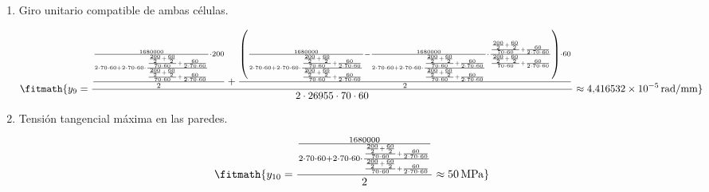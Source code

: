 \begin{enumerate}
\[\fitmath{y_{8}=\frac{1680000}{2\cdot 70\cdot 60+2\cdot 70\cdot 60\cdot \frac{\frac{\frac{200}{2}+\frac{60}{2}}{70\cdot 60}+\frac{60}{2\cdot 70\cdot 60}}{\frac{\frac{200}{2}+\frac{60}{2}}{70\cdot 60}+\frac{60}{2\cdot 70\cdot 60}}}-\frac{1680000}{2\cdot 70\cdot 60+2\cdot 70\cdot 60\cdot \frac{\frac{\frac{200}{2}+\frac{60}{2}}{70\cdot 60}+\frac{60}{2\cdot 70\cdot 60}}{\frac{\frac{200}{2}+\frac{60}{2}}{70\cdot 60}+\frac{60}{2\cdot 70\cdot 60}}}\cdot \frac{\frac{\frac{200}{2}+\frac{60}{2}}{70\cdot 60}+\frac{60}{2\cdot 70\cdot 60}}{\frac{\frac{200}{2}+\frac{60}{2}}{70\cdot 60}+\frac{60}{2\cdot 70\cdot 60}}\approx 6{,}946121\times10^{-164}\,\mathrm{N/mm}}\]

\item Giro unitario compatible de ambas células.

\[\fitmath{y_{9}=\frac{\frac{\frac{1680000}{2\cdot 70\cdot 60+2\cdot 70\cdot 60\cdot \frac{\frac{\frac{200}{2}+\frac{60}{2}}{70\cdot 60}+\frac{60}{2\cdot 70\cdot 60}}{\frac{\frac{200}{2}+\frac{60}{2}}{70\cdot 60}+\frac{60}{2\cdot 70\cdot 60}}}\cdot 200}{2}+\frac{\left(\frac{1680000}{2\cdot 70\cdot 60+2\cdot 70\cdot 60\cdot \frac{\frac{\frac{200}{2}+\frac{60}{2}}{70\cdot 60}+\frac{60}{2\cdot 70\cdot 60}}{\frac{\frac{200}{2}+\frac{60}{2}}{70\cdot 60}+\frac{60}{2\cdot 70\cdot 60}}}-\frac{1680000}{2\cdot 70\cdot 60+2\cdot 70\cdot 60\cdot \frac{\frac{\frac{200}{2}+\frac{60}{2}}{70\cdot 60}+\frac{60}{2\cdot 70\cdot 60}}{\frac{\frac{200}{2}+\frac{60}{2}}{70\cdot 60}+\frac{60}{2\cdot 70\cdot 60}}}\cdot \frac{\frac{\frac{200}{2}+\frac{60}{2}}{70\cdot 60}+\frac{60}{2\cdot 70\cdot 60}}{\frac{\frac{200}{2}+\frac{60}{2}}{70\cdot 60}+\frac{60}{2\cdot 70\cdot 60}}\right)\cdot 60}{2}}{2\cdot 26955\cdot 70\cdot 60}\approx 4{,}416532\times10^{-5}\,\mathrm{rad/mm}}\]

\item Tensión tangencial máxima en las paredes.

\[\fitmath{y_{10}=\frac{\frac{1680000}{2\cdot 70\cdot 60+2\cdot 70\cdot 60\cdot \frac{\frac{\frac{200}{2}+\frac{60}{2}}{70\cdot 60}+\frac{60}{2\cdot 70\cdot 60}}{\frac{\frac{200}{2}+\frac{60}{2}}{70\cdot 60}+\frac{60}{2\cdot 70\cdot 60}}}}{2}\approx 50\,\mathrm{MPa}}\]

\end{enumerate}
